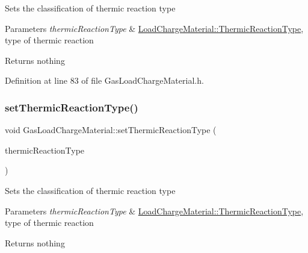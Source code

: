Sets the classification of thermic reaction type


\begin{DoxyParams}{Parameters}
{\em thermic\+Reaction\+Type} & \hyperlink{class_load_charge_material_a51d4263e865a5d86236622dd3fe23fd1}{Load\+Charge\+Material\+::\+Thermic\+Reaction\+Type}, type of thermic reaction\\
\hline
\end{DoxyParams}
\begin{DoxyReturn}{Returns}
nothing 
\end{DoxyReturn}


Definition at line 83 of file Gas\+Load\+Charge\+Material.\+h.

\mbox{\label{class_gas_load_charge_material_ac48eb07a3008f1dc0ff433353b59536d}} 
\subsubsection{\texorpdfstring{set\+Thermic\+Reaction\+Type()}{setThermicReactionType()}\hspace{0.1cm}{\footnotesize\ttfamily [3/3]}}
{\footnotesize\ttfamily void Gas\+Load\+Charge\+Material\+::set\+Thermic\+Reaction\+Type (\begin{DoxyParamCaption}\item[{\hyperlink{class_load_charge_material_a51d4263e865a5d86236622dd3fe23fd1}{Load\+Charge\+Material\+::\+Thermic\+Reaction\+Type}}]{thermic\+Reaction\+Type }\end{DoxyParamCaption})\hspace{0.3cm}{\ttfamily [inline]}}

Sets the classification of thermic reaction type


\begin{DoxyParams}{Parameters}
{\em thermic\+Reaction\+Type} & \hyperlink{class_load_charge_material_a51d4263e865a5d86236622dd3fe23fd1}{Load\+Charge\+Material\+::\+Thermic\+Reaction\+Type}, type of thermic reaction\\
\hline
\end{DoxyParams}
\begin{DoxyReturn}{Returns}
nothing 
\end{DoxyReturn}


